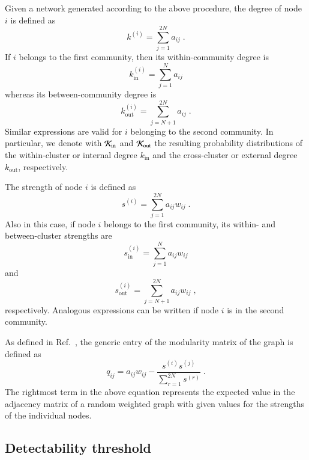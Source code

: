 \documentclass[a4paper,pre,superscriptaddress,floatfix,nofootinbib,twocolumn]{revtex4-1}
\begin{document}
Given a network generated according to the above procedure, the degree of node $i$ is defined as
\begin{equation}
    k^{(i)} = \sum_{j=1}^{2N} a_{ij} \; .
    \label{eq:degree}
\end{equation}
If $i$ belongs to the first community, then its within-community degree is
\begin{equation}
    k^{(i)}_\text{in} = \sum_{j=1}^{N} a_{ij}
    \label{eq:in_degree}
\end{equation}
whereas its between-community degree is
\begin{equation}
    k^{(i)}_\text{out} = \sum_{j=N+1}^{2N} a_{ij} \; .
    \label{eq:out_degree}
\end{equation}
Similar expressions are valid for $i$ belonging to the second community.
In particular, we denote with ${\cal K}_\text{in}$ and ${\cal K}_\text{out}$ the resulting probability distributions
of the within-cluster or internal degree $k_\text{in}$  and the cross-cluster or external degree $k_\text{out}$, respectively.

The strength of node $i$ is defined as
\begin{equation}
    s^{(i)} = \sum_{j=1}^{2N} a_{ij} w_{ij} \; .
    \label{eq:strength}
\end{equation}
Also in this case, if node $i$ belongs to the first community, its within- and between-cluster strengths are
\begin{equation}
    s^{(i)}_\text{in} = \sum_{j=1}^{N} a_{ij} w_{ij}
    \label{eq:in_strength}
\end{equation}
and
\begin{equation}
    s^{(i)}_\text{out} = \sum_{j=N+1}^{2N} a_{ij} w_{ij} \; ,
    \label{eq:out_strength}
\end{equation}
respectively. Analogous expressions can be written if node $i$ is in the second community.

As defined in Ref.~\cite{newman2006modularity},
the generic entry of the modularity matrix of the graph is defined as
\begin{equation}
q_{ij} = a_{ij} w_{ij} - \frac{s^{(i)} s^{(j)}}{ \sum_{r=1}^{2N} s^{(r)}} \; .
    \label{eq:modularity}
\end{equation}
The rightmost term in the above equation represents the expected value in the adjacency matrix of a random weighted graph with given values for the strengths of the individual nodes.



\subsection*{Detectability threshold}
\end{document}
